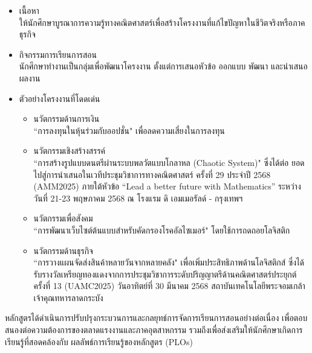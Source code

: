 {{\begin{enumerate}
	\begin{itemize}
		\item เนื้อหา \\ให้นักศึกษาบูรณาการความรู้ทางคณิตศาสตร์เพื่อสร้างโครงงานที่แก้ไขปัญหาในชีวิตจริงหรือภาคธุรกิจ
		\item กิจกรรมการเรียนการสอน \\นักศึกษาทำงานเป็นกลุ่มเพื่อพัฒนาโครงงาน ตั้งแต่การเสนอหัวข้อ ออกแบบ พัฒนา และนำเสนอผลงาน
		\item ตัวอย่างโครงงานที่โดดเด่น
		\begin{itemize}
			\item นวัตกรรมด้านการเงิน \\ ``การลงทุนในหุ้นร่วมกับออปชั่น" เพื่อลดความเสี่ยงในการลงทุน
			\item นวัตกรรมเชิงสร้างสรรค์ \\``การสร้างรูปแบบดนตรีผ่านระบบพลวัตแบบโกลาหล (Chaotic System)" ซึ่งได้ต่อ ยอดไปสู่การนำเสนอในเวทีประชุมวิชาการทางคณิตศาสตร์ ครั้งที่ 29 ประจำปี 2568 (AMM2025) ภายใต้หัวข้อ  “Lead a better future with Mathematics” ระหว่างวันที่ 21-23 พฤษภาคม 2568 ณ โรงแรม ดิ เอมเมอรัลด์ - กรุงเทพฯ
			\item นวัตกรรมเพื่อสังคม\\``การพัฒนาเว็บไซต์ต้นแบบสำหรับคัดกรองโรคอัลไซเมอร์" โดยใช้การถดถอยโลจิสติก
			\item นวัตกรรมด้านธุรกิจ\\``การวางแผนจัดส่งสินค้าหลายวันจากหลายคลัง" เพื่อเพิ่มประสิทธิภาพด้านโลจิสติกส์ ซึ่งได้รับรางวัลเหรียญทองแดงจากการประชุมวิชาการระดับปริญญาตรีด้านคณิตศาสตร์ประยุกต์ ครั้งที่ 13 (UAMC2025) วันอาทิตย์ที่ 30 มีนาคม 2568 สถาบันเทคโนโลยีพระจอมเกล้าเจ้าคุณทหารลาดกระบัง 
			\end{itemize}
		\end{itemize}
\end{enumerate}



 
\begin{doclist}
\end{doclist}

หลักสูตรได้ดำเนินการปรับปรุงกระบวนการและกลยุทธ์การจัดการเรียนการสอนอย่างต่อเนื่อง เพื่อตอบสนองต่อความต้องการของตลาดแรงงานและภาคอุตสาหกรรม รวมถึงเพื่อส่งเสริมให้นักศึกษาเกิดการเรียนรู้ที่สอดคล้องกับ ผลลัพธ์การเรียนรู้ของหลักสูตร (PLOs) 

}}
